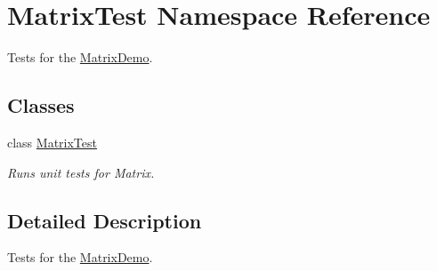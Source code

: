 \hypertarget{namespace_matrix_test}{}\section{Matrix\+Test Namespace Reference}
\label{namespace_matrix_test}


Tests for the \mbox{\hyperlink{namespace_matrix_demo}{Matrix\+Demo}}.  


\subsection*{Classes}
\begin{DoxyCompactItemize}
\item 
class \mbox{\hyperlink{class_matrix_test_1_1_matrix_test}{Matrix\+Test}}
\begin{DoxyCompactList}\small\item\em Runs unit tests for Matrix. \end{DoxyCompactList}\end{DoxyCompactItemize}


\subsection{Detailed Description}
Tests for the \mbox{\hyperlink{namespace_matrix_demo}{Matrix\+Demo}}. 

